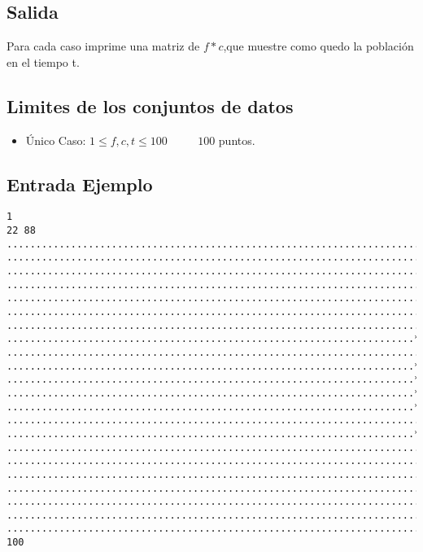 \subsection*{Salida}
Para cada caso imprime una matriz de $f*c$,que muestre como quedo la población en el tiempo t.

\subsection*{Limites de los conjuntos de datos}
\begin{itemize}
    \item Único Caso: $ 1\leq f, c, t \leq 100 $ $\quad \quad$ $100$ puntos.
\end{itemize}

\newpage
\subsection*{Entrada Ejemplo}
\begin{verbatim}
1
22 88
........................................................................................
........................................................................................
........................................................................................
........................................................................................
........................................................................................
........................................................................*...............
.......................................................................*.......*.*......
......................................................................**..*.*..*........
..........................................................................**.**.........
......................................................................**.*..***.........
......................................................................****...**...*.....
......................................................................****...**...*.....
......................................................................**.*..***.........
..........................................................................**.**.........
......................................................................**..*.*..*........
.......................................................................*.......*.*......
........................................................................*...............
........................................................................................
........................................................................................
........................................................................................
........................................................................................
........................................................................................
100
\end{verbatim}


